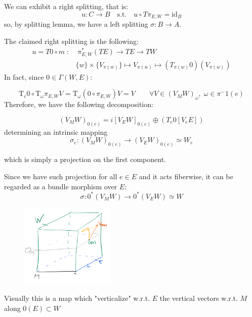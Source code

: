 \documentclass[a4paper,12pt,fleqn]{scrartcl}  %
\begin{document}
We can exhibit a right splitting, that is:
\begin{displaymath}
	u : C \rightarrow B \quad \textrm{s.t.} \quad u \circ T \pi_{E,W} = \textrm{id}_B
\end{displaymath}
so, by splitting lemma, we have a left splitting $\sigma : B \rightarrow A$.

The claimed right splitting is the following:
\begin{align*}
		u = T0 \circ m \; : & \; \pi^\ast_{E,W} \left(TE \right) \rightarrow TE \rightarrow TW \\
						& \{w\} \times \{V_{\pi(w)} \} \mapsto V_{\pi(w)} \mapsto \left( T_{\pi(w)}0\right) (V_{\pi(w)})
\end{align*}
In fact, since $0 \in \Gamma (W,E)$:

\begin{displaymath}
	\textrm{T}_e 0 \circ \textrm{T}_\omega \pi_{E,W} V =
	\textrm{T}_\omega \left( 0 \circ \pi_{E,W} \right) V = 
	V \qquad \forall V \in \left( V_M W \right)_\omega ,\; \omega \in \pi^-1(e)
\end{displaymath}
Therefore, we have the following decomposition:

\begin{displaymath}
	\left( V_M W \right)_{0(e)} = 
	i\left[ V_E W \right]_{0(e)} \oplus \left( T_e 0 \left[ V_e E\right] \right)
\end{displaymath}
determining an intrinsic mapping 
\begin{displaymath}
	\sigma_e : \left( V_M W \right)_{0(e)} \rightarrow \left( V_E W \right)_{0(e)} \simeq W_e
\end{displaymath}

which is simply a  projection on the first component.

Since we have such projection for all $e \in E$ and it acts fiberwise, it can be regarded as a bundle morphism over $E$:
\begin{displaymath}
	\sigma : 0^\ast \left( V_M W \right) \rightarrow 0^\ast \left( V_E W \right) \simeq W
\end{displaymath} 

\begin{figure}
\centering
\includegraphics[width=0.40\textwidth]{Pictures/sigma.png}
\end{figure}
Visually this is a map which "verticalize" w.r.t. $E$ the vertical vectors w.r.t. $M$ along $0(E) \subset W$
\end{document}

